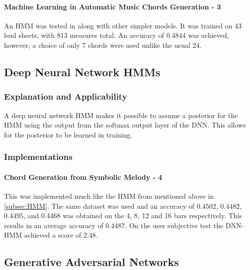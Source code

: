 \paragraph{Machine Learning in Automatic Music Chords Generation - 3} An HMM was tested in \cite{MLForChords} along with other simpler models. It was trained on 43 lead sheets, with 813 measures total. 
An accuracy of $0.4844$ was achieved, however, a choice of only 7 chords were used unlike the usual 24.


\subsection{Deep Neural Network HMMs}

\label{subsec:DNN-HMMs}
\subsubsection{Explanation and Applicability} 

A deep neural network HMM makes it possible to assume a posterior for the HMM using the output from the softmax output layer of the DNN. 
This allows for the posterior to be learned in training.

\subsubsection{Implementations}

\paragraph{Chord Generation from Symbolic Melody - 4} This was implemented much like the HMM from \cite{BLSTM} mentioned above in \cref{subsec:HMM}.
The same dataset was used and an accuracy of $0.4502$, $0.4482$, $0.4495$, and $0.4468$  was obtained on the 4, 8, 12 and 16 bars respectively. This results in an average accuracy of $0.4487$.
On the user subjective test the DNN-HMM achieved a score of $2.48$.

\subsection{Generative Adversarial Networks}

